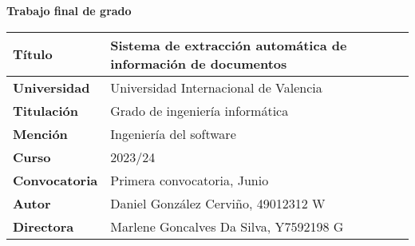 \noindent
\Huge\textbf{Trabajo final de grado}
\normalfont\normalsize
\vspace{3em}
\begin{table}[h]
    \renewcommand{\arraystretch}{1.5}
    \begin{tabular}{p{} p{}}
        \hline\textbf{Título}       & Sistema de extracción automática de información de documentos \\
        \hline\textbf{Universidad}  & Universidad Internacional de Valencia                         \\
        \hline\textbf{Titulación}   & Grado de ingeniería informática                               \\
        \hline\textbf{Mención}      & Ingeniería del software                                       \\
        \hline\textbf{Curso}        & 2023/24                                                       \\
        \hline\textbf{Convocatoria} & Primera convocatoria, Junio                                   \\
        \hline\textbf{Autor}        & Daniel González Cerviño, 49012312 W                           \\
        \hline\textbf{Directora}    & Marlene Goncalves Da Silva, Y7592198 G                        \\
        \hline
    \end{tabular}
    \label{tab:}
\end{table}
